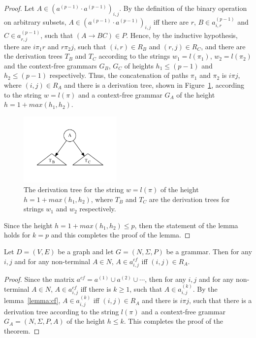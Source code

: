 \begin{proof}
Let $A \in (a^{(p-1)} \cdot a^{(p-1)})_{i,j}$. By the definition of the binary operation on arbitrary subsets, $A \in (a^{(p-1)} \cdot a^{(p-1)})_{i,j}$ iff there are $r$, $B \in a^{(p-1)}_{i,r}$ and $C \in a^{(p-1)}_{r,j}$, such that $(A \rightarrow B C) \in P$. Hence, by the inductive hypothesis, there are $i \pi_1 r$ and $r \pi_2 j$, such that $(i,r) \in R_B$ and $(r,j) \in R_C$, and there are the derivation trees $T_B$ and $T_C$ according to the strings $w_1 = l(\pi_1)$, $w_2 = l(\pi_2)$ and the context-free grammars $G_B$, $G_C$ of heights $h_1 \leq (p-1)$ and $h_2 \leq (p-1)$ respectively. Thus, the concatenation of paths $\pi_1$ and $\pi_2$ is $i \pi j$, where $(i,j) \in R_A$ and there is a derivation tree, shown in Figure~\ref{tree2}, according to the string $w = l(\pi)$ and a context-free grammar $G_A$ of the height $h = 1 + max(h_1, h_2)$.

\begin{figure}[h!]
 \centering
 \includegraphics[width=5cm]{pictures/tree2.pdf}
 \caption{The derivation tree for the string $w = l(\pi)$ of the height $h = 1 + max(h_1, h_2)$, where $T_B$ and $T_C$ are the derivation trees for strings $w_1$ and $w_2$ respectively.}
 \label{tree2}
\end{figure}

Since the height $h = 1 + max(h_1, h_2) \leq p$, then the statement of the lemma holds for $k = p$ and this completes the proof of the lemma.
\end{proof}

\begin{mytheorem}\label{thm:correct}
 Let $D = (V,E)$ be a graph and let $G =(N,\Sigma,P)$ be a grammar. Then for any $i, j$ and for any non-terminal $A \in N$, $A \in a^{cf}_{i,j}$ iff $(i,j) \in R_A$.
\end{mytheorem}
\begin{proof}

Since the matrix $a^{cf} = a^{(1)} \cup a^{(2)} \cup \cdots$, then for any $i, j$ and for any non-terminal $A \in N$, $A \in a^{cf}_{i,j}$ iff there is $k \geq 1$, such that $A \in a^{(k)}_{i,j}$. By the lemma~\ref{lemma:cf}, $A \in a^{(k)}_{i,j}$ iff $(i,j) \in R_A$ and there is $i \pi j$, such that there is a derivation tree according to the string $l(\pi)$ and a context-free grammar $G_A = (N,\Sigma,P,A)$ of the height $h \leq k$. This completes the proof of the theorem.
\end{proof}

